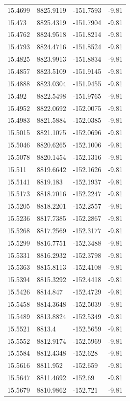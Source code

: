 \begin{table}[H]
\begin{tabular}{llll}
15.4699 & 8825.9119 & -151.7593 & -9.81 \\
15.473 & 8825.4319 & -151.7904 & -9.81 \\
15.4762 & 8824.9518 & -151.8214 & -9.81 \\
15.4793 & 8824.4716 & -151.8524 & -9.81 \\
15.4825 & 8823.9913 & -151.8834 & -9.81 \\
15.4857 & 8823.5109 & -151.9145 & -9.81 \\
15.4888 & 8823.0304 & -151.9455 & -9.81 \\
15.492 & 8822.5498 & -151.9765 & -9.81 \\
15.4952 & 8822.0692 & -152.0075 & -9.81 \\
15.4983 & 8821.5884 & -152.0385 & -9.81 \\
15.5015 & 8821.1075 & -152.0696 & -9.81 \\
15.5046 & 8820.6265 & -152.1006 & -9.81 \\
15.5078 & 8820.1454 & -152.1316 & -9.81 \\
15.511 & 8819.6642 & -152.1626 & -9.81 \\
15.5141 & 8819.183 & -152.1937 & -9.81 \\
15.5173 & 8818.7016 & -152.2247 & -9.81 \\
15.5205 & 8818.2201 & -152.2557 & -9.81 \\
15.5236 & 8817.7385 & -152.2867 & -9.81 \\
15.5268 & 8817.2569 & -152.3177 & -9.81 \\
15.5299 & 8816.7751 & -152.3488 & -9.81 \\
15.5331 & 8816.2932 & -152.3798 & -9.81 \\
15.5363 & 8815.8113 & -152.4108 & -9.81 \\
15.5394 & 8815.3292 & -152.4418 & -9.81 \\
15.5426 & 8814.847 & -152.4729 & -9.81 \\
15.5458 & 8814.3648 & -152.5039 & -9.81 \\
15.5489 & 8813.8824 & -152.5349 & -9.81 \\
15.5521 & 8813.4 & -152.5659 & -9.81 \\
15.5552 & 8812.9174 & -152.5969 & -9.81 \\
15.5584 & 8812.4348 & -152.628 & -9.81 \\
15.5616 & 8811.952 & -152.659 & -9.81 \\
15.5647 & 8811.4692 & -152.69 & -9.81 \\
15.5679 & 8810.9862 & -152.721 & -9.81 \\

\end{tabular}
\end{table}
